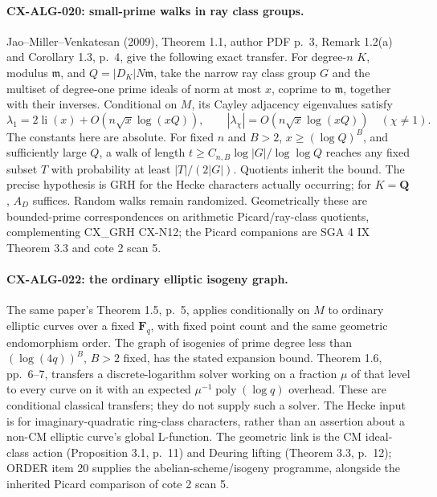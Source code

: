 \documentclass[11pt,a4paper]{article}
\begin{document}
\paragraph{CX-ALG-020: small-prime walks in ray class groups.}
Jao--Miller--Venkatesan (2009), Theorem 1.1, author PDF p.~3,
Remark 1.2(a) and Corollary 1.3, p.~4, give the following exact transfer.
For degree-$n$ $K$, modulus $\mathfrak m$, and
$Q=|D_K|N\mathfrak m$, take the narrow ray class group $G$ and the
multiset of degree-one prime ideals of norm at most $x$, coprime to
$\mathfrak m$, together with their inverses. Conditional on $M$, its
Cayley adjacency eigenvalues satisfy
\[
 \lambda_1=2\operatorname{li}(x)+O(n\sqrt x\log(xQ)),\qquad
 |\lambda_\chi|=O(n\sqrt x\log(xQ))\quad(\chi\ne1).
\]
The constants here are absolute. For fixed $n$ and $B>2$,
$x\ge(\log Q)^B$, and sufficiently large $Q$, a walk of length
$t\ge C_{n,B}\log|G|/\log\log Q$ reaches any fixed subset $T$ with
probability at least $|T|/(2|G|)$. Quotients inherit the bound.
The precise hypothesis is GRH for the Hecke characters actually occurring;
for $K=\mathbf Q$, $A_D$ suffices. Random walks remain randomized.
Geometrically these are bounded-prime correspondences on arithmetic
Picard/ray-class quotients, complementing CX\_GRH CX-N12; the Picard
companions are SGA 4 IX Theorem 3.3 and cote 2 scan 5.

\paragraph{CX-ALG-022: the ordinary elliptic isogeny graph.}
The same paper's Theorem 1.5, p.~5, applies conditionally on $M$ to ordinary
elliptic curves over a fixed $\mathbf F_q$, with fixed point count and
the same geometric endomorphism order. The graph of isogenies of prime
degree less than $(\log(4q))^B$, $B>2$ fixed, has the stated expansion
bound. Theorem 1.6, pp.~6--7, transfers a discrete-logarithm solver working
on a fraction $\mu$ of that level to every curve on it with an expected
$\mu^{-1}\operatorname{poly}(\log q)$ overhead. These are conditional
classical transfers; they do not supply such a solver. The Hecke input is
for imaginary-quadratic ring-class characters, rather than an assertion
about a non-CM elliptic curve's global L-function. The geometric link is
the CM ideal-class action (Proposition 3.1, p.~11) and Deuring lifting
(Theorem 3.3, p.~12); ORDER item 20 supplies the abelian-scheme/isogeny
programme, alongside the inherited Picard comparison of cote 2 scan 5.
\end{document}
